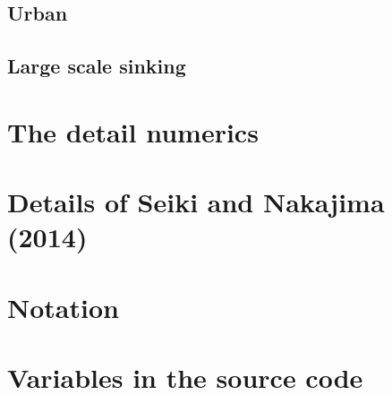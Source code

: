 \documentclass[a4paper]{report}
\begin{document}
\section{Urban}


%

\section{Large scale sinking}





\appendix
\chapter{The detail numerics}



\chapter{Details of Seiki and Nakajima (2014)}


\chapter{Notation}


\chapter{Variables in the source code}

\end{document}
